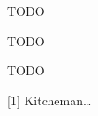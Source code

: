 \documentclass[times, 10pt,twocolumn]{article}
\begin{document}
TODO


TODO


TODO
 
[1] Kitcheman\ldots

\nocite{ex1,ex2}
 

\end{document}
